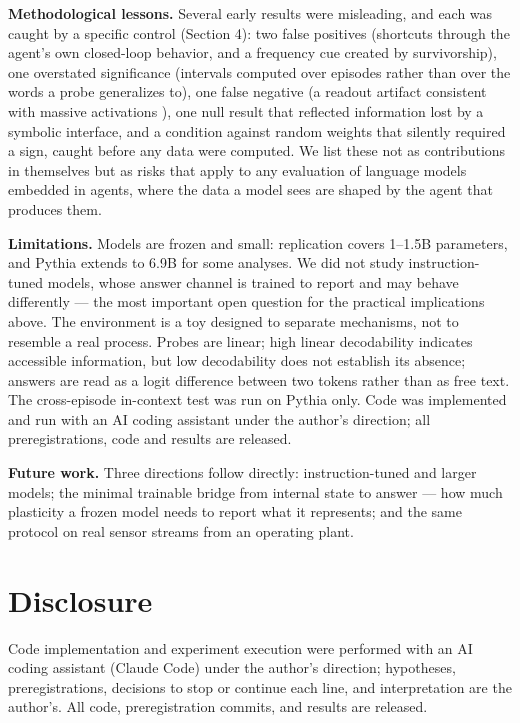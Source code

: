 \documentclass[11pt]{article}
\begin{document}
\textbf{Methodological lessons.} Several early results were misleading, and each was caught by a specific control (Section 4): two false positives (shortcuts through the agent's own closed-loop behavior, and a frequency cue created by survivorship), one overstated significance (intervals computed over episodes rather than over the words a probe generalizes to), one false negative (a readout artifact consistent with massive activations \citep{sun2024}), one null result that reflected information lost by a symbolic interface, and a condition against random weights that silently required a sign, caught before any data were computed. We list these not as contributions in themselves but as risks that apply to any evaluation of language models embedded in agents, where the data a model sees are shaped by the agent that produces them.

\textbf{Limitations.} Models are frozen and small: replication covers 1--1.5B parameters, and Pythia extends to 6.9B for some analyses. We did not study instruction-tuned models, whose answer channel is trained to report and may behave differently --- the most important open question for the practical implications above. The environment is a toy designed to separate mechanisms, not to resemble a real process. Probes are linear; high linear decodability indicates accessible information, but low decodability does not establish its absence; answers are read as a logit difference between two tokens rather than as free text. The cross-episode in-context test was run on Pythia only. Code was implemented and run with an AI coding assistant under the author's direction; all preregistrations, code and results are released.

\textbf{Future work.} Three directions follow directly: instruction-tuned and larger models; the minimal trainable bridge from internal state to answer --- how much plasticity a frozen model needs to report what it represents; and the same protocol on real sensor streams from an operating plant.


\section*{Disclosure}
Code implementation and experiment execution were performed with an AI coding assistant (Claude Code) under the author's direction; hypotheses, preregistrations, decisions to stop or continue each line, and interpretation are the author's. All code, preregistration commits, and results are released.
\end{document}
